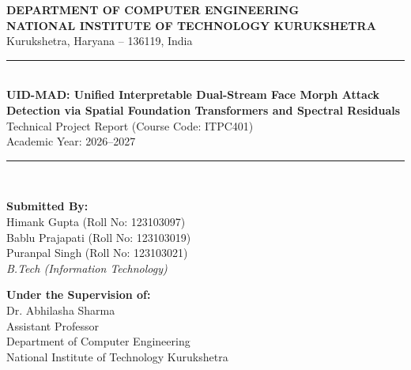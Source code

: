 \documentclass[11pt,a4paper]{article}
\begin{document}
\begin{center}
    {\large \textbf{DEPARTMENT OF COMPUTER ENGINEERING}}\\[2pt]
    {\large \textbf{NATIONAL INSTITUTE OF TECHNOLOGY KURUKSHETRA}}\\[2pt]
    {\normalsize Kurukshetra, Haryana -- 136119, India}\\[10pt]

    \rule{\textwidth}{1.2pt}\\[10pt]

    {\LARGE \textbf{UID-MAD: Unified Interpretable Dual-Stream Face Morph Attack Detection via Spatial Foundation Transformers and Spectral Residuals}}\\[8pt]
    
    {\large Technical Project Report (Course Code: ITPC401)}\\[3pt]
    {\normalsize Academic Year: 2026--2027}\\[8pt]

    \rule{\textwidth}{0.6pt}\\[12pt]

    \begin{minipage}{0.48\textwidth}
        \textbf{Submitted By:}\\[4pt]
        Himank Gupta (Roll No: 123103097)\\[2pt]
        Bablu Prajapati (Roll No: 123103019)\\[2pt]
        Puranpal Singh (Roll No: 123103021)\\[4pt]
        \textit{B.Tech (Information Technology)}
    \end{minipage}
    \hfill
    \begin{minipage}{0.48\textwidth}
        \flushright
        \textbf{Under the Supervision of:}\\[4pt]
        Dr. Abhilasha Sharma\\[2pt]
        Assistant Professor\\[2pt]
        Department of Computer Engineering\\[2pt]
        National Institute of Technology Kurukshetra
    \end{minipage}
\end{center}

\vspace{8pt}
\end{document}
